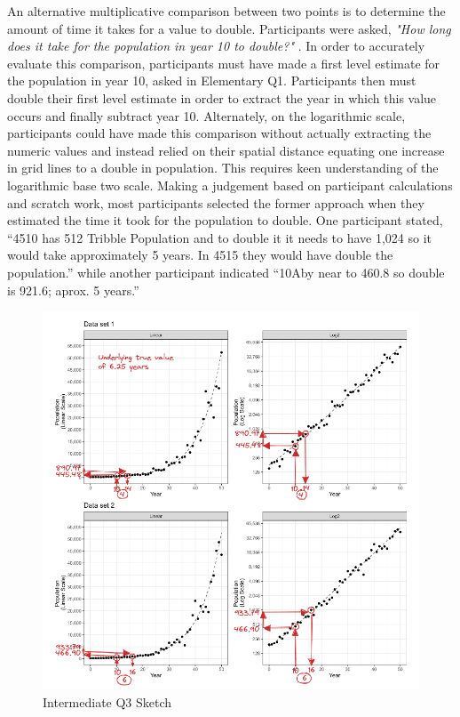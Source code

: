 \documentclass[print]{nuthesis}
\begin{document}
An alternative multiplicative comparison between two points is to determine the amount of time it takes for a value to double.
Participants were asked, \textit{"How long does it take for the population in year 10 to double?"} .
In order to accurately evaluate this comparison, participants must have made a first level estimate for the population in year 10, asked in Elementary Q1.
Participants then must double their first level estimate in order to extract the year in which this value occurs and finally subtract year 10.
Alternately, on the logarithmic scale, participants could have made this comparison without actually extracting the numeric values and instead relied on their spatial distance equating one increase in grid lines to a double in population.
This requires keen understanding of the logarithmic base two scale.
Making a judgement based on participant calculations and scratch work, most participants selected the former approach when they estimated the time it took for the population to double.
One participant stated, ``4510 has 512 Tribble Population and to double it it needs to have 1,024 so it would take approximately 5 years. In 4515 they would have double the population.'' while another participant indicated ``10Aby near to 460.8 so double is 921.6; aprox. 5 years.''

\begin{figure}[tbp]

{\centering \includegraphics[width=1\linewidth,]{images/03-estimation/qi3-sketch} 

}

\caption{Intermediate Q3 Sketch}\label{fig:qi3-sketch}
\end{figure}
\end{document}
